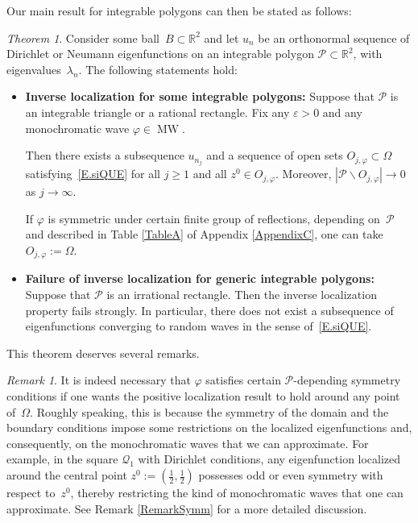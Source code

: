 \documentclass{amsart}
\theoremstyle{definition}
\theoremstyle{remark}
\newtheorem{remark}[theorem]{Remark}
\newcommand{\ep}{\varepsilon}
\newcommand{\la}{\lambda}
\newcommand{\vp}{\varphi}
\newcommand{\Om}{\Omega}
\def\RR{\mathbb{R}}
\renewcommand\geq\geqslant
\numberwithin{equation}{section}
\newcounter{bigthm}
\newtheorem{bigtheorem}[bigthm]{Theorem} %
\theoremstyle{definition}
\theoremstyle{remark}
\def\RR{\mathbb{R}}
\DeclareMathOperator\MW{MW}
\begin{document}
Our main result for integrable polygons can then be stated as follows:


\begin{bigtheorem}\label{BT.polygons}
	Consider some ball~$B\subset\RR^2$ and let $u_n$ be an orthonormal sequence of Dirichlet or Neumann eigenfunctions on an integrable polygon  $\mathcal P\subset\RR^2$, with eigenvalues~$\la_n$. The following statements hold:
	\begin{itemize}
		\item \textbf{Inverse localization for some integrable polygons:} Suppose that $\mathcal P$ is an integrable triangle or a rational rectangle. Fix any $\ep>0$ and any monochromatic wave $\vp\in\MW$. 

		Then there exists a subsequence $u_{n_j}$ and a sequence of open sets $O_{j,\vp}\subset\Om$ satisfying~\eqref{E.siQUE} for all $j\geq1$ and all $z^0\in O_{j,\vp}$. Moreover, $|\mathcal P\backslash O_{j,\vp}|\to0$ as $j\to\infty$. 
		
		If $\vp$ is symmetric under certain finite group of reflections, depending on~$\mathcal P$ and described in Table \eqref{TableA} of  Appendix \ref{AppendixC}, one can take $O_{j,\vp}:=\Om$.\smallskip
		
		\item \textbf{Failure of inverse localization for generic integrable polygons:} Suppose that $\mathcal P$ is an irrational rectangle. Then the inverse localization property fails strongly. In particular, there does not exist a subsequence of eigenfunctions converging to random waves in the sense of~\eqref{E.siQUE}.
	\end{itemize}
	
	\end{bigtheorem}
	This theorem deserves several remarks.
	
	\begin{remark}\label{R.symmetry}
	It is indeed necessary that $\vp$ satisfies certain $\mathcal P$-depending symmetry conditions if one wants the positive localization result to hold around any point of~$\Om$.  Roughly speaking, this is because the symmetry of the domain and the boundary conditions impose some restrictions on the localized eigenfunctions and, consequently, on the monochromatic waves that we can approximate. For example, in the square $\mathcal{Q}_1$ with Dirichlet conditions, any eigenfunction localized around the central point $z^0:=\left(\frac{1}{2},\frac{1}{2}\right)$ possesses odd or even symmetry with respect to~$z^0$, thereby restricting the kind of monochromatic waves that one can approximate. See Remark \ref{RemarkSymm} for a more detailed discussion. 
	\end{remark}
\end{document}
